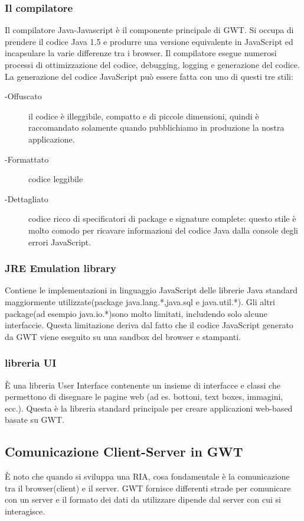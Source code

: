 \subsubsection*{Il compilatore}
Il compilatore Java-Javascript \`e il componente principale di GWT. Si occupa di prendere il codice Java 1.5 e produrre una versione equivalente in JavaScript ed incapsulare la varie differenze tra i browser.
Il compilatore esegue numerosi processi di ottimizzazione del codice, debugging, logging e generazione del codice.
La generazione del codice JavaScript pu\`o essere fatta con uno di questi tre stili:
\begin{description}
\item[-Offuscato]il codice \`e illeggibile, compatto e di piccole dimensioni, quindi \`e raccomandato solamente quando pubblichiamo in produzione la nostra applicazione.
\item[-Formattato]codice leggibile
\item[-Dettagliato]codice ricco di specificatori di package e signature complete: questo stile \`e molto comodo per ricavare informazioni del codice Java dalla console degli errori JavaScript.
\end{description}
\subsubsection*{JRE Emulation library}
Contiene le implementazioni in linguaggio JavaScript delle librerie Java standard maggiormente utilizzate(package java.lang.*,java.sql e java.util.*). Gli altri package(ad esempio java.io.*)sono molto limitati, includendo solo alcune interfaccie. Questa limitazione deriva dal fatto che il codice JavaScript generato da GWT viene eseguito su una sandbox del browser e stampanti.
\subsubsection*{libreria UI}
\`E una libreria User Interface contenente un insieme di interfacce e classi che permettono di disegnare le pagine web (ad es. bottoni, text boxes, immagini, ecc.). Questa \`e la libreria standard principale per creare applicazioni web-based basate su GWT.
\subsection{Comunicazione Client-Server in GWT}
\`E noto che quando si sviluppa una RIA, cosa fondamentale \`e la comunicazione tra il browser(client) e il server.
GWT fornisce differenti strade per comunicare con un server e il formato dei dati da utilizzare dipende dal server con cui si interagisce.

